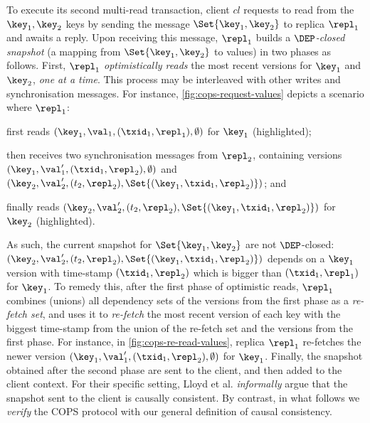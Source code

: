 To execute its second multi-read transaction,
client  \( cl \) requests to read from the $\key_1, \key_2$ keys by sending the message 
\( \Set{\key_1, \key_2} \) to replica $\repl_1$ and awaits a reply.
Upon receiving this message, $\repl_1$ builds a \emph{\( \DEP \)-closed snapshot} (a mapping from $\Set{\key_1, \key_2}$ to values) in two phases as follows. 
First, $\repl_1$ \emph{optimistically reads} the most recent versions for $\key_1$ and $\key_2$,
\emph{one at a time}. 
This process may be interleaved with other writes and synchronisation messages. 
For instance, \cref{fig:cops-request-values} depicts a scenario where \( \repl_1 \):
\begin{enumerate*}
	\item first reads \( (\key_1,\val_1,(\txid_1,\repl_1), \emptyset) \) for $\key_1$ (highlighted); %
	\item then receives two synchronisation messages from \( \repl_2 \), 
containing versions \( ( \key_1, \val'_1, (\txid_1,\repl_2),\emptyset ) \) and \( ( \key_2, \val'_2, (t_2,\repl_2),\Set{(\key_1,\txid_1,\repl_2)} ) \); and
	\item finally reads \( ( \key_2, \val'_2, (t_2,\repl_2),\Set{(\key_1,\txid_1,\repl_2)} ) \) for $\key_2$ (highlighted).
\end{enumerate*}
As such, the current snapshot for \( \Set{\key_1,\key_2}\) are not \( \DEP \)-closed: 
\( ( \key_2, \val'_2, (t_2,\repl_2),\Set{(\key_1,\txid_1,\repl_2)} ) \) depends on 
a $\key_1$ version with time-stamp $(\txid_1, \repl_2)$ which is bigger than $(\txid_1, \repl_1)$ for $\key_1$.
To remedy this, after the first phase of optimistic reads,
$\repl_1$ combines (unions) all dependency sets of the versions from the first phase as a \emph{re-fetch set},
and uses it to \emph{re-fetch}
the most recent version of each key with the biggest time-stamp 
from the union of the re-fetch set and the versions from the first phase.
For instance, in \cref{fig:cops-re-read-values}, replica $\repl_1$ re-fetches 
the newer version \( ( \key_1, \val'_1, (\txid_1,\repl_2),\emptyset ) \) for \( \key_1 \).
Finally, the snapshot obtained after the second phase 
are sent to the client, and then added to the client context.
For their specific setting, Lloyd et al. \citet{cops} \emph{informally} argue that the snapshot sent to the client is causally consistent.
By contrast, in what follows we \emph{verify} the COPS protocol with our general definition of causal consistency.



